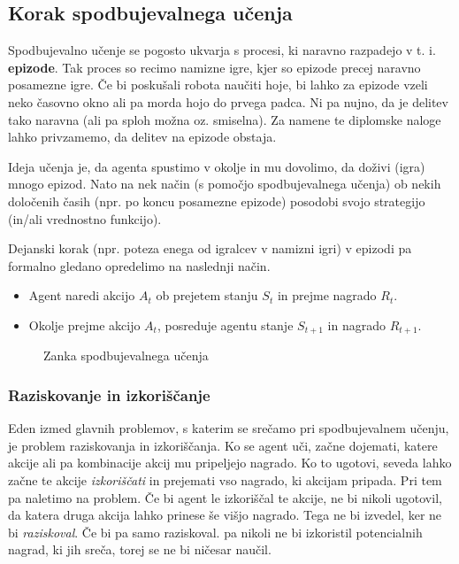\documentclass[12pt,a4paper]{amsart}
\theoremstyle{definition} %
\theoremstyle{plain} %
\begin{document}
\subsection{Korak spodbujevalnega učenja}
Spodbujevalno učenje se pogosto ukvarja s procesi, ki naravno razpadejo v t. i. \textbf{epizode}. 
Tak proces so recimo namizne igre, kjer so epizode precej naravno posamezne igre. Če bi poskušali 
robota naučiti hoje, bi lahko za epizode vzeli neko časovno okno ali pa morda hojo do prvega padca.
Ni pa nujno, da je delitev tako naravna (ali pa sploh možna oz. smiselna). Za namene te diplomske 
naloge lahko privzamemo, da delitev na epizode obstaja.

Ideja učenja je, da agenta spustimo v okolje in mu dovolimo, da doživi (igra) mnogo epizod. Nato 
na nek način (s pomočjo spodbujevalnega učenja) ob nekih določenih časih (npr. po koncu posamezne 
epizode) posodobi svojo strategijo (in/ali vrednostno funkcijo). 

Dejanski korak (npr. poteza enega od igralcev v namizni igri) v epizodi pa formalno gledano opredelimo
 na naslednji način.
\begin{itemize}
    \item Agent naredi akcijo $A_t$ ob prejetem stanju $S_t$ in prejme nagrado $R_t$.
    \item Okolje prejme akcijo $A_t$, posreduje agentu stanje $S_{t+1}$ in nagrado $R_{t+1}$.
\end{itemize}
\begin{center}
    \begin{figure}[h]
    \caption{Zanka spodbujevalnega učenja}
    \end{figure}
\end{center}
\subsubsection{Raziskovanje in izkoriščanje}
Eden izmed glavnih problemov, s katerim se srečamo pri spodbujevalnem učenju, je problem 
raziskovanja in izkoriščanja. Ko se agent uči, začne dojemati, katere akcije ali pa kombinacije 
akcij mu pripeljejo nagrado. Ko to ugotovi, seveda lahko začne te akcije \textit{izkoriščati} in 
prejemati vso nagrado, ki akcijam pripada. Pri tem pa naletimo na problem. Če bi agent le izkoriščal 
te akcije, ne bi nikoli ugotovil, da katera druga akcija lahko prinese še višjo nagrado. Tega ne bi 
izvedel, ker ne bi \textit{raziskoval}. Če bi pa samo raziskoval. pa nikoli ne bi izkoristil potencialnih
 nagrad, ki jih sreča, torej se ne bi ničesar naučil.
\end{document}
